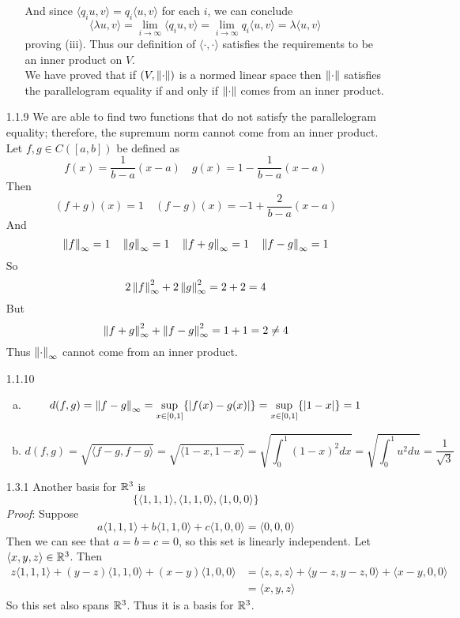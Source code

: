 \documentclass[../../Solutions.tex]{subfiles}
\begin{document}
\begin{itemize}
\begin{enumerate}[(a)]
		And since $\langle q_i u,v \rangle = q_i \langle u,v \rangle$ for each $i$, we can conclude
		$$ \langle \lambda u,v \rangle = \lim_{i \to \infty} \langle q_i u,v \rangle = \lim_{i \to \infty} q_i \langle u,v \rangle = \lambda \langle u,v \rangle $$
		proving (iii).
		Thus our definition of $\langle\cdot,\cdot\rangle$ satisfies the requirements to be an inner product on $V$. \\
		We have proved that if $(V,\left\lVert\cdot\right\rVert)$ is a normed linear space then $\left\lVert\cdot\right\rVert$ satisfies the parallelogram equality if and only if $\left\lVert\cdot\right\rVert$ comes from an inner product.
	\end{enumerate}
	
	\item [1.1.9] We are able to find two functions that do not satisfy the parallelogram equality; therefore, the supremum norm cannot come from an inner product.
	Let $f,g \in C([a,b])$ be defined as
	$$ f(x) = \frac{1}{b-a}(x-a) \quad g(x)=1-\frac{1}{b-a}(x-a) $$
	Then
	$$ (f+g)(x) = 1 \quad (f-g)(x) = -1+\frac{2}{b-a}(x-a) $$
	And
	$$ \left\lVert f\right\rVert_\infty = 1 \quad \left\lVert g\right\rVert_\infty = 1 \quad \left\lVert f+g\right\rVert_\infty = 1 \quad \left\lVert f-g\right\rVert_\infty = 1 $$
	So
	$$ 2\left\lVert f\right\rVert_\infty^2 + 2\left\lVert g\right\rVert_\infty^2 = 2+2 = 4 $$
	But
	$$ \left\lVert f+g\right\rVert_\infty^2+\left\lVert f-g\right\rVert_\infty^2 = 1+1 = 2 \neq 4 $$
	Thus $\left\lVert\cdot\right\rVert_\infty$ cannot come from an inner product.
	
	\item [1.1.10]
	\begin{enumerate}[(a)]
		\item \begin{equation*}
			d(f,g) = \left\lVert f-g\right\rVert_\infty = \sup_{x\in [0,1]}\{|f(x)-g(x)|\} = \sup_{x\in [0,1]}\{|1-x|\} = 1
		\end{equation*}
		\item \begin{equation*}
			d(f,g) = \sqrt{\langle f-g , f-g \rangle} = \sqrt{\langle 1-x,1-x \rangle}
				 = \sqrt{\int_{0}^{1} (1-x)^2 dx} = \sqrt{\int_0^1 u^2 du} = \frac{1}{\sqrt{3}}
		\end{equation*}
	\end{enumerate}
	
	\item [1.3.1] Another basis for $\mathbb{R}^3$ is
	$$ \{ \langle 1,1,1 \rangle , \langle 1,1,0 \rangle , \langle 1,0,0 \rangle \} $$
	\textit{Proof}: Suppose
	$$ a\langle 1,1,1 \rangle + b\langle 1,1,0 \rangle + c\langle 1,0,0 \rangle = \langle 0,0,0 \rangle $$
	Then we can see that $a = b = c = 0$, so this set is linearly independent.
	Let $\langle x,y,z \rangle \in \mathbb{R}^3$.
	Then
	\begin{equation*} \begin{split}
		z\langle 1,1,1 \rangle + (y-z)\langle 1,1,0 \rangle + (x-y)\langle 1,0,0 \rangle &
			= \langle z,z,z \rangle + \langle y-z,y-z,0 \rangle + \langle x-y,0,0 \rangle \\
			& = \langle x,y,z \rangle
	\end{split} \end{equation*}
	So this set also spans $\mathbb{R}^3$.
	Thus it is a basis for $\mathbb{R}^3$.
	

\end{itemize}
\end{document}
